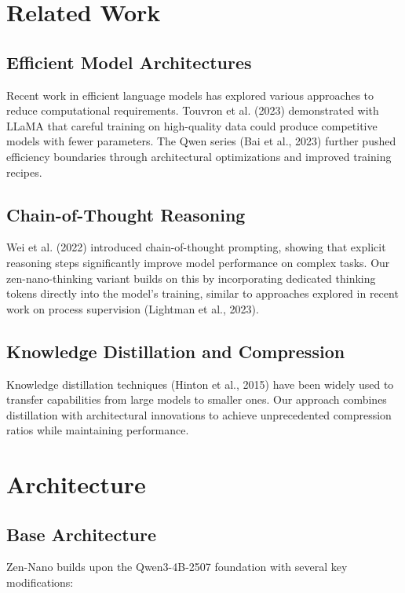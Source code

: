 \documentclass[11pt,a4paper]{article}
\begin{document}
\section{Related Work}

\subsection{Efficient Model Architectures}

Recent work in efficient language models has explored various approaches to reduce computational requirements. Touvron et al. (2023) demonstrated with LLaMA that careful training on high-quality data could produce competitive models with fewer parameters. The Qwen series (Bai et al., 2023) further pushed efficiency boundaries through architectural optimizations and improved training recipes.

\subsection{Chain-of-Thought Reasoning}

Wei et al. (2022) introduced chain-of-thought prompting, showing that explicit reasoning steps significantly improve model performance on complex tasks. Our zen-nano-thinking variant builds on this by incorporating dedicated thinking tokens directly into the model's training, similar to approaches explored in recent work on process supervision (Lightman et al., 2023).

\subsection{Knowledge Distillation and Compression}

Knowledge distillation techniques (Hinton et al., 2015) have been widely used to transfer capabilities from large models to smaller ones. Our approach combines distillation with architectural innovations to achieve unprecedented compression ratios while maintaining performance.

\section{Architecture}

\subsection{Base Architecture}

Zen-Nano builds upon the Qwen3-4B-2507 foundation with several key modifications:
\end{document}
